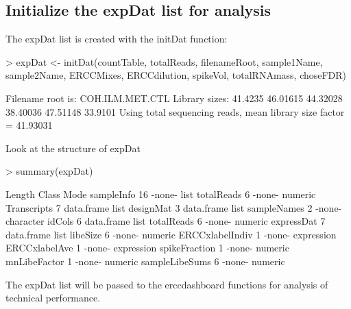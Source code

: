 \documentclass{article}
\begin{document}
\subsection{Initialize the expDat list for analysis}
The expDat list is created with the initDat function:
\begin{Schunk}
\begin{Sinput}
> expDat <- initDat(countTable, totalReads, filenameRoot, sample1Name,
                    sample2Name, ERCCMixes, ERCCdilution, spikeVol, totalRNAmass,
                    choseFDR)
\end{Sinput}
\begin{Soutput}
Filename root is: COH.ILM.MET.CTL 
Library sizes:
41.4235 46.01615 44.32028 38.40036 47.51148 33.9101
Using total sequencing reads,
 mean library size factor = 41.93031
\end{Soutput}
\end{Schunk}
Look at the structure of expDat
\begin{Schunk}
\begin{Sinput}
> summary(expDat)
\end{Sinput}
\begin{Soutput}
                Length Class      Mode      
sampleInfo      16     -none-     list      
totalReads       6     -none-     numeric   
Transcripts      7     data.frame list      
designMat        3     data.frame list      
sampleNames      2     -none-     character 
idCols           6     data.frame list      
totalReads       6     -none-     numeric   
expressDat       7     data.frame list      
libeSize         6     -none-     numeric   
ERCCxlabelIndiv  1     -none-     expression
ERCCxlabelAve    1     -none-     expression
spikeFraction    1     -none-     numeric   
mnLibeFactor     1     -none-     numeric   
sampleLibeSums   6     -none-     numeric   
\end{Soutput}
\end{Schunk}
The expDat list will be passed to the erccdashboard functions for analysis of 
technical performance.
\end{document}
